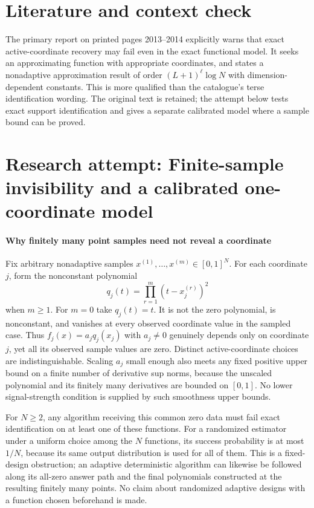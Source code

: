 \documentclass[11pt]{article}
\begin{document}
\section{Literature and context check}
The primary report on printed pages 2013--2014 explicitly warns that exact active-coordinate recovery may fail even in the exact functional model. It seeks an approximating function with appropriate coordinates, and states a nonadaptive approximation result of order $(L+1)^\ell\log N$ with dimension-dependent constants. This is more qualified than the catalogue's terse identification wording. The original text is retained; the attempt below tests exact support identification and gives a separate calibrated model where a sample bound can be proved.
\section{Research attempt: Finite-sample invisibility and a calibrated one-coordinate model}

\paragraph{Why finitely many point samples need not reveal a coordinate}
Fix arbitrary nonadaptive samples $x^{(1)},\ldots,x^{(m)}\in[0,1]^N$. For each coordinate $j$, form the nonconstant polynomial
\[
 q_j(t)=\prod_{r=1}^m(t-x_j^{(r)})^2
\]
when $m\geq1$. For $m=0$ take $q_j(t)=t$. It is not the zero polynomial, is nonconstant, and vanishes at every observed coordinate value in the sampled case. Thus $f_j(x)=a_jq_j(x_j)$ with $a_j\ne0$ genuinely depends only on coordinate $j$, yet all its observed sample values are zero. Distinct active-coordinate choices are indistinguishable. Scaling $a_j$ small enough also meets any fixed positive upper bound on a finite number of derivative sup norms, because the unscaled polynomial and its finitely many derivatives are bounded on $[0,1]$. No lower signal-strength condition is supplied by such smoothness upper bounds.

For $N\geq2$, any algorithm receiving this common zero data must fail exact identification on at least one of these functions. For a randomized estimator under a uniform choice among the $N$ functions, its success probability is at most $1/N$, because its same output distribution is used for all of them. This is a fixed-design obstruction; an adaptive deterministic algorithm can likewise be followed along its all-zero answer path and the final polynomials constructed at the resulting finitely many points. No claim about randomized adaptive designs with a function chosen beforehand is made.
\end{document}
